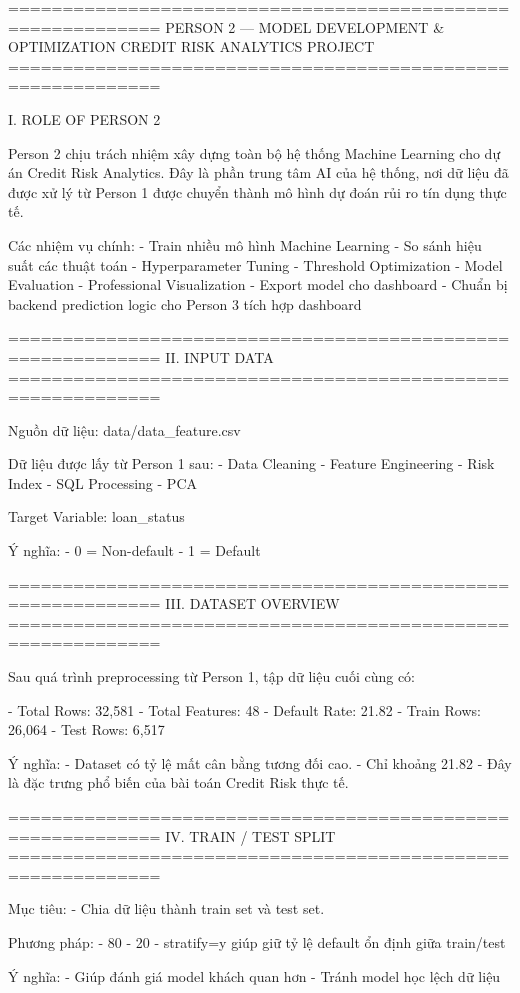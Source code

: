 ============================================================
PERSON 2 — MODEL DEVELOPMENT & OPTIMIZATION
CREDIT RISK ANALYTICS PROJECT
============================================================

I. ROLE OF PERSON 2

Person 2 chịu trách nhiệm xây dựng toàn bộ hệ thống Machine Learning cho dự án Credit Risk Analytics. Đây là phần trung tâm AI của hệ thống, nơi dữ liệu đã được xử lý từ Person 1 được chuyển thành mô hình dự đoán rủi ro tín dụng thực tế.

Các nhiệm vụ chính:
- Train nhiều mô hình Machine Learning
- So sánh hiệu suất các thuật toán
- Hyperparameter Tuning
- Threshold Optimization
- Model Evaluation
- Professional Visualization
- Export model cho dashboard
- Chuẩn bị backend prediction logic cho Person 3 tích hợp dashboard

============================================================
II. INPUT DATA
============================================================

Nguồn dữ liệu:
data/data_feature.csv

Dữ liệu được lấy từ Person 1 sau:
- Data Cleaning
- Feature Engineering
- Risk Index
- SQL Processing
- PCA

Target Variable:
loan_status

Ý nghĩa:
- 0 = Non-default
- 1 = Default

============================================================
III. DATASET OVERVIEW
============================================================

Sau quá trình preprocessing từ Person 1, tập dữ liệu cuối cùng có:

- Total Rows: 32,581
- Total Features: 48
- Default Rate: 21.82%
- Train Rows: 26,064
- Test Rows: 6,517

Ý nghĩa:
- Dataset có tỷ lệ mất cân bằng tương đối cao.
- Chỉ khoảng 21.82%
- Đây là đặc trưng phổ biến của bài toán Credit Risk thực tế.

============================================================
IV. TRAIN / TEST SPLIT
============================================================

Mục tiêu:
- Chia dữ liệu thành train set và test set.

Phương pháp:
- 80%
- 20%
- stratify=y giúp giữ tỷ lệ default ổn định giữa train/test

Ý nghĩa:
- Giúp đánh giá model khách quan hơn
- Tránh model học lệch dữ liệu

